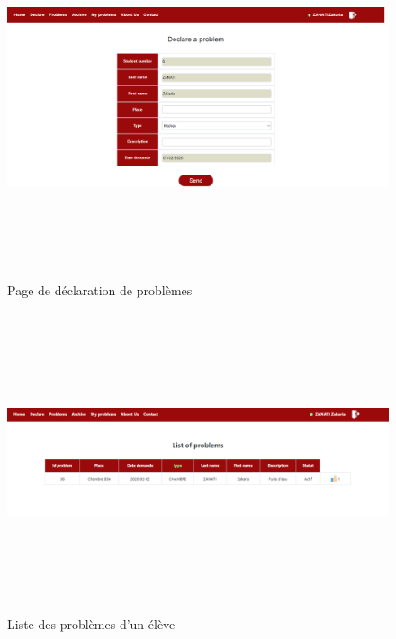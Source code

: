 \documentclass[11.5pt]{report}
\begin{document}
\newpage
\begin{figure}[h]
	
	\begin{center}
		\includegraphics[width=500pt,height=300pt]{declare.png} 
		\caption{Page de déclaration de problèmes}
	\end{center}
	
\end{figure}
\newpage
\begin{figure}[h]
	
	\begin{center}
		\includegraphics[width=500pt,height=250pt]{problems-eleve.png} 
		\caption{Liste des problèmes d'un élève}
	\end{center}
	
\end{figure}
\end{document}
